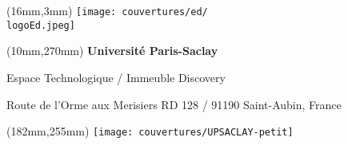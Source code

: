 
\pagestyle{empty}

\begin{textblock*}{61mm}(16mm,3mm)
	\noindent\texttt{[image: couvertures/ed/\\logoEd.jpeg]}
\end{textblock*}



\begin{center}
\end{center}

\vspace*{0mm}

\begin{center}
\end{center}


\begin{textblock*}{161mm}(10mm,270mm)
\color{bordeau}
{\bf\noindent Université Paris-Saclay	         }

\noindent Espace Technologique / Immeuble Discovery

\noindent Route de l’Orme aux Merisiers RD 128 / 91190 Saint-Aubin, France
\end{textblock*}

\begin{textblock*}{20mm}(182mm,255mm)
\texttt{[image: couvertures/UPSACLAY-petit]}
\end{textblock*}
